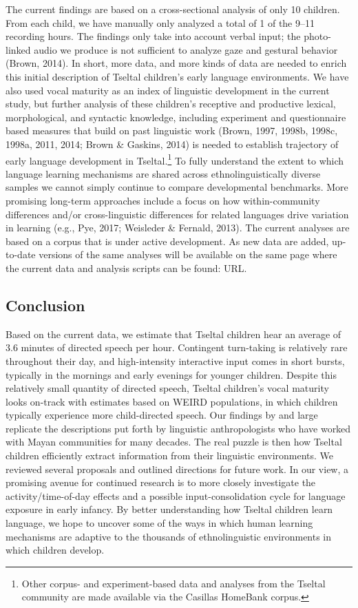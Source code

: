 \documentclass[floatsintext,man]{apa6}
\theoremstyle{definition}
\theoremstyle{definition}
\theoremstyle{definition}
\theoremstyle{remark}
\begin{document}
The current findings are based on a cross-sectional analysis of only 10
children. From each child, we have manually only analyzed a total of 1
of the 9--11 recording hours. The findings only take into account verbal
input; the photo-linked audio we produce is not sufficient to analyze
gaze and gestural behavior (Brown, 2014). In short, more data, and more
kinds of data are needed to enrich this initial description of Tseltal
children's early language environments. We have also used vocal maturity
as an index of linguistic development in the current study, but further
analysis of these children's receptive and productive lexical,
morphological, and syntactic knowledge, including experiment and
questionnaire based measures that build on past linguistic work (Brown,
1997, 1998b, 1998c, 1998a, 2011, 2014; Brown \& Gaskins, 2014) is needed
to establish trajectory of early language development in
Tseltal.\footnote{Other corpus- and experiment-based data and analyses
  from the Tseltal community are made available via the Casillas
  HomeBank corpus.} To fully understand the extent to which language
learning mechanisms are shared across ethnolinguistically diverse
samples we cannot simply continue to compare developmental benchmarks.
More promising long-term approaches include a focus on how
within-community differences and/or cross-linguistic differences for
related languages drive variation in learning (e.g., Pye, 2017;
Weisleder \& Fernald, 2013). The current analyses are based on a corpus
that is under active development. As new data are added, up-to-date
versions of the same analyses will be available on the same page where
the current data and analysis scripts can be found: URL.

\subsection{Conclusion}\label{disc-conclusion}

Based on the current data, we estimate that Tseltal children hear an
average of 3.6 minutes of directed speech per hour. Contingent
turn-taking is relatively rare throughout their day, and high-intensity
interactive input comes in short bursts, typically in the mornings and
early evenings for younger children. Despite this relatively small
quantity of directed speech, Tseltal children's vocal maturity looks
on-track with estimates based on WEIRD populations, in which children
typically experience more child-directed speech. Our findings by and
large replicate the descriptions put forth by linguistic anthropologists
who have worked with Mayan communities for many decades. The real puzzle
is then how Tseltal children efficiently extract information from their
linguistic environments. We reviewed several proposals and outlined
directions for future work. In our view, a promising avenue for
continued research is to more closely investigate the
activity/time-of-day effects and a possible input-consolidation cycle
for language exposure in early infancy. By better understanding how
Tseltal children learn language, we hope to uncover some of the ways in
which human learning mechanisms are adaptive to the thousands of
ethnolinguistic environments in which children develop.
\end{document}
